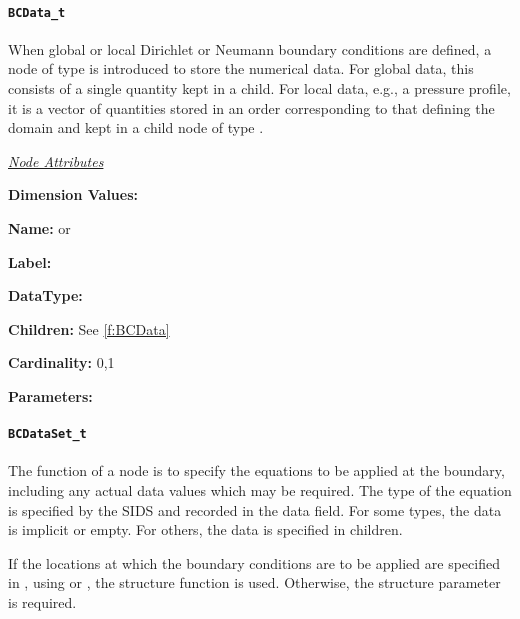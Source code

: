 \paragraph{\texttt{BCData\_t}}

When global or local Dirichlet or Neumann boundary conditions are
defined, a node of type  is introduced to store the
numerical data. For global data, this consists of a single quantity kept
in a  child. For local
data, e.g., a pressure profile, it is a vector of quantities stored in
an order corresponding to that defining the domain and kept in a child
node of type .

\textit{\uline{Node Attributes}}
\begin{Ventryic}{\textbf{Dimension Values:}}
\item [\textbf{Name:}]
       or 
\item [\textbf{Label:}]
\item [\textbf{DataType:}]
\item [\textbf{Children:}]
      See \autoref{f:BCData}
\item [\textbf{Cardinality:}]
      0,1
\item [\textbf{Parameters:}]
\end{Ventryic}

\paragraph{\texttt{BCDataSet\_t}}

The function of a  node is to specify the equations
to be applied at the boundary, including any actual data values which
may be required. The type of the equation is specified by the SIDS and
recorded in the data field. For some types, the data is implicit or
empty. For others, the data is specified in  children.

If the locations at which the boundary conditions are to be applied
are specified in , using  or
, the structure function  is used.
Otherwise, the structure parameter  is required.

